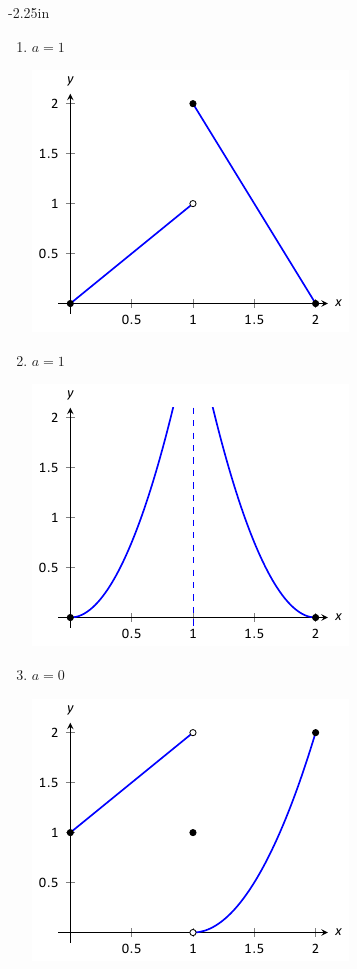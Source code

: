 \begin{adjustwidth*}{}{-2.25in}
\begin{multicols*}{2}
\begin{enumerate}[1),resume]
\item
{\noindent $a = 1$

\includegraphics[scale=.8]{figures/fig01_04_ex_06}
}

\vspace{.5cm}

\item
{\noindent $a = 1$

\includegraphics[scale=.8]{figures/fig01_04_ex_07}
}

\item
{\noindent $a = 0$

\includegraphics[scale=.8]{figures/fig01_04_ex_08}
}


\end{enumerate}
\end{multicols*}
\end{adjustwidth*}
